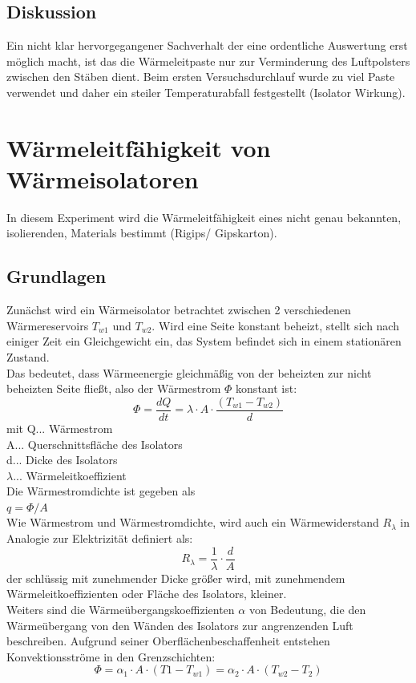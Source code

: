 \documentclass[12pt,a4paper]{article}
\begin{document}
\begin{multicols}{2}

\subsection{Diskussion}
Ein nicht klar hervorgegangener Sachverhalt der eine ordentliche Auswertung erst möglich macht, ist das die Wärmeleitpaste nur zur Verminderung des Luftpolsters zwischen den Stäben dient. Beim ersten Versuchsdurchlauf wurde zu viel Paste verwendet und daher ein steiler Temperaturabfall festgestellt (Isolator Wirkung).\\


\section{Wärmeleitfähigkeit von Wärmeisolatoren}
In diesem Experiment wird die Wärmeleitfähigkeit eines nicht genau bekannten, isolierenden, Materials bestimmt (Rigips/ Gipskarton).

\subsection{Grundlagen}
Zunächst wird ein Wärmeisolator betrachtet zwischen 2 verschiedenen Wärmereservoirs $T_{w1}$ und $T_{w2}$. Wird eine Seite konstant beheizt, stellt sich nach einiger Zeit ein Gleichgewicht ein, das System befindet sich in einem stationären Zustand.\\
Das bedeutet, dass Wärmeenergie gleichmäßig von der beheizten zur nicht beheizten Seite fließt, also der Wärmestrom $\Phi$ konstant ist:
$$\Phi=\frac{dQ}{dt}=\lambda \cdot A \cdot \frac{(T_{w1}-T_{w2})}{d}$$
mit Q... Wärmestrom\\
A... Querschnittsfläche des Isolators\\
d... Dicke des Isolators\\
$\lambda$... Wärmeleitkoeffizient\\
Die Wärmestromdichte ist gegeben als\\
$q=\Phi/A$\\
Wie Wärmestrom und Wärmestromdichte, wird auch ein Wärmewiderstand $R_{\lambda}$ in Analogie zur Elektrizität definiert als:
$$R_{\lambda}=\frac{1}{\lambda}\cdot \frac{d}{A} $$
der schlüssig mit zunehmender Dicke größer wird, mit zunehmendem Wärmeleitkoeffizienten oder Fläche des Isolators, kleiner.\\
Weiters sind die Wärmeübergangskoeffizienten $\alpha$ von Bedeutung, die den Wärmeübergang von den Wänden des Isolators zur angrenzenden Luft beschreiben. Aufgrund seiner Oberflächenbeschaffenheit entstehen Konvektionsströme in den Grenzschichten:
$$\Phi = \alpha_1 \cdot A \cdot (T1-T_{w1}) = \alpha_2 \cdot A \cdot (T_{w2}-T_2) $$


\end{multicols}
\end{document}
